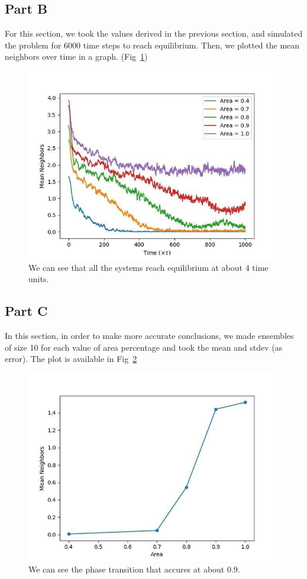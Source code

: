 \documentclass[12pt, a4paper]{article}
\begin{document}
	\subsection{Part B}
	For this section, we took the values derived in the previous section, and simulated the problem for 6000 time steps to reach equilibrium. Then,
	we plotted the mean neighbors over time in a graph. (Fig~\ref{fig:mean_neighbors})
	
	\begin{figure}[h!]
		\centering
		\includegraphics[width=.8\linewidth]{../p3/results/mean_neighbors.jpg}
		\caption{We can see that all the systems reach equilibrium at about 4 time units.}
		\label{fig:mean_neighbors}
	\end{figure}
	
	\subsection{Part C}
	In this section, in order to make more accurate conclusions, we made ensembles of size 10 for each value of area percentage and took the mean
	and stdev (as error). The plot is available in Fig~\ref{fig:eq_mean_neighbors}
	
	\begin{figure}[h!]
		\centering
		\includegraphics[width=.8\linewidth]{../p3/results/eq_mean_neighbors.jpg}
		\caption{We can see the phase transition that accures at about 0.9.}
		\label{fig:eq_mean_neighbors}
	\end{figure}
\end{document}
